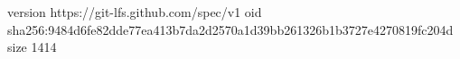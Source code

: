 version https://git-lfs.github.com/spec/v1
oid sha256:9484d6fe82dde77ea413b7da2d2570a1d39bb261326b1b3727e4270819fc204d
size 1414
